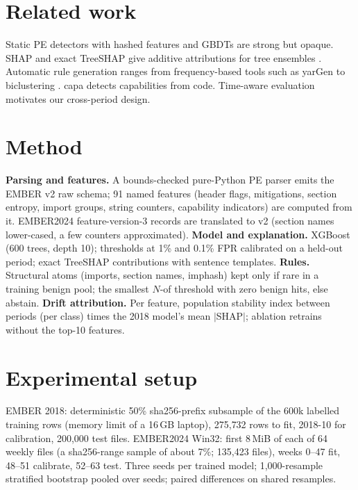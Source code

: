 \documentclass[10pt]{article}
\begin{document}
\section{Related work}
Static PE detectors with hashed features and GBDTs \citep{anderson2018ember,ke2017lightgbm} are strong
but opaque. SHAP \citep{lundberg2017shap} and exact TreeSHAP \citep{lundberg2020tree} give additive
attributions for tree ensembles \citep{chen2016xgboost}. Automatic rule generation ranges from
frequency-based tools such as yarGen \citep{yargen} to biclustering \citep{raff2020autoyara}.
capa \citep{capa} detects capabilities from code. Time-aware evaluation \citep{pendlebury2019tesseract}
motivates our cross-period design.

\section{Method}
\textbf{Parsing and features.} A bounds-checked pure-Python PE parser emits the EMBER v2 raw schema;
91 named features (header flags, mitigations, section entropy, import groups, string counters,
capability indicators) are computed from it. EMBER2024 feature-version-3 records are translated to v2
(section names lower-cased, a few counters approximated).
\textbf{Model and explanation.} XGBoost (600 trees, depth 10); thresholds at 1\% and 0.1\% FPR
calibrated on a held-out period; exact TreeSHAP contributions with sentence templates.
\textbf{Rules.} Structural atoms (imports, section names, imphash) kept only if rare in a training
benign pool; the smallest $N$-of threshold with zero benign hits, else abstain.
\textbf{Drift attribution.} Per feature, population stability index between periods (per class)
times the 2018 model's mean $|$SHAP$|$; ablation retrains without the top-10 features.

\section{Experimental setup}
EMBER 2018: deterministic 50\% sha256-prefix subsample of the 600k labelled training rows (memory
limit of a 16\,GB laptop), 275{,}732 rows to fit, 2018-10 for calibration, 200{,}000 test files.
EMBER2024 Win32: first 8\,MiB of each of 64 weekly files (a sha256-range sample of about 7\%;
135{,}423 files), weeks 0--47 fit, 48--51 calibrate, 52--63 test. Three seeds per trained model;
1{,}000-resample stratified bootstrap pooled over seeds; paired differences on shared resamples.
\end{document}
